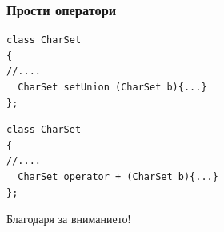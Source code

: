 \documentclass{beamer}
\begin{document}
\begin{frame}[fragile]
\frametitle{Прости оператори}

\begin{flushleft}
\begin{lstlisting}
class CharSet
{
//....
  CharSet setUnion (CharSet b){...}
};
\end{lstlisting}
\end{flushleft}

\pause

\begin{flushleft}
\begin{lstlisting}
class CharSet
{
//....
  CharSet operator + (CharSet b){...}
};
\end{lstlisting}
\end{flushleft}

\end{frame}



\begin{frame}
\centerline{Благодаря за вниманието!}
\end{frame}
\end{document}

